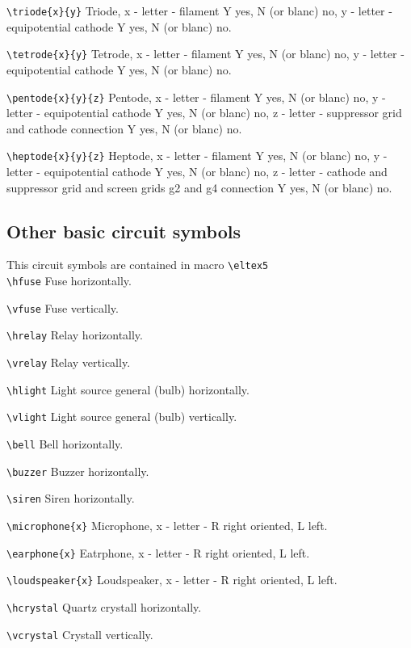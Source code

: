 \noindent
\verb?\triode{x}{y}?
Triode, x - letter - filament Y yes, N (or blanc) no,
y - letter - equipotential cathode Y yes, N (or blanc) no.

\noindent
\verb?\tetrode{x}{y}?
Tetrode, x - letter - filament Y yes, N (or blanc) no,
y - letter - equipotential cathode Y yes, N (or blanc) no.

\noindent
\verb?\pentode{x}{y}{z}?
Pentode, x - letter - filament Y yes, N (or blanc) no,
y - letter - equipotential cathode Y yes, N (or blanc) no,
z - letter - suppressor grid and cathode connection
Y yes, N (or blanc) no.


\noindent
\verb?\heptode{x}{y}{z}?
Heptode, x - letter - filament Y yes, N (or blanc) no,
y - letter - equipotential cathode Y yes, N (or blanc) no,
z - letter - cathode and
suppressor grid and screen grids g2 and g4 connection Y yes,
N  (or blanc) no.


\subsection{Other basic circuit symbols}

This circuit symbols are contained in macro \verb?\eltex5? \\

\noindent
\verb?\hfuse?
Fuse horizontally.

\noindent
\verb?\vfuse?
Fuse vertically.


\noindent
\verb?\hrelay?
Relay horizontally.


\noindent
\verb?\vrelay?
Relay vertically.

\noindent
\verb?\hlight?
Light source general (bulb) horizontally.

\noindent
\verb?\vlight?
Light source general (bulb) vertically.


\noindent
\verb?\bell?
Bell horizontally.

\noindent
\verb?\buzzer?
Buzzer horizontally.


\noindent
\verb?\siren?
Siren horizontally.


\noindent
\verb?\microphone{x}?
Microphone, x - letter - R right oriented,
L left.


\noindent
\verb?\earphone{x}?
Eatrphone, x - letter - R right oriented,
L left.

\noindent
\verb?\loudspeaker{x}?
Loudspeaker, x - letter - R right oriented,
L left.

\noindent
\verb?\hcrystal?
Quartz crystall horizontally.

\noindent
\verb?\vcrystal?
Crystall vertically.


